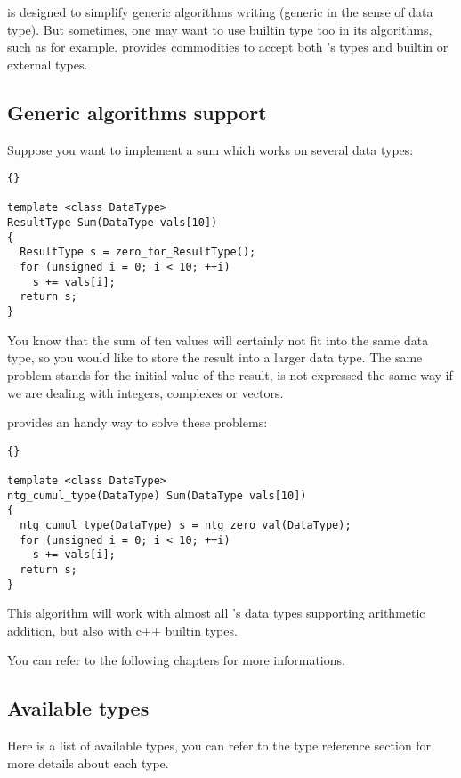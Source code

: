 {\integre} is designed to simplify generic algorithms writing (generic
in the sense of data type). But sometimes, one may want to use builtin
type too in its algorithms, such as  for example. {\integre}
provides commodities to accept both {\integre}'s types and builtin or
external types.

\subsection{Generic algorithms support}

Suppose you want to implement a sum which works on several data types:


\begin{lstlisting}{}

template <class DataType>
ResultType Sum(DataType vals[10])
{
  ResultType s = zero_for_ResultType();
  for (unsigned i = 0; i < 10; ++i)
    s += vals[i];
  return s;
}

\end{lstlisting}

You know that the sum of ten values will certainly not fit into the
same data type, so you would like to store the result into a larger
data type. The same problem stands for the initial value of the
result,  is not expressed the same way if we are dealing with
integers, complexes or vectors.

{\integre} provides an handy way to solve these problems:

\begin{lstlisting}{}

template <class DataType>
ntg_cumul_type(DataType) Sum(DataType vals[10])
{
  ntg_cumul_type(DataType) s = ntg_zero_val(DataType);
  for (unsigned i = 0; i < 10; ++i)
    s += vals[i];
  return s;
}

\end{lstlisting}

This algorithm will work with almost all {\integre}'s data types
supporting arithmetic addition, but also with c++ builtin types.

You can refer to the following chapters for more informations.

\subsection{Available types}

Here is a list of available types, you can refer to the type reference
section for more details about each type.

